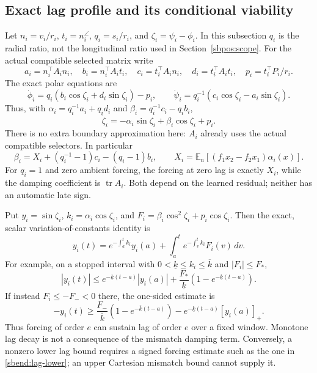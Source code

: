 \documentclass{article} %
\theoremstyle{plain}
\theoremstyle{definition}
\theoremstyle{remark}
\begin{document}
\subsection{Exact lag profile and its conditional viability}

Let $n_i=v_i/r_i$, $t_i=n_i^\angle$, $q_i=s_i/r_i$, and
$\zeta_i=\psi_i-\phi_i$. In this subsection $q_i$ is the radial ratio,
not the longitudinal ratio used in Section~\ref{sbpos:scope}.
For the actual compatible selected matrix write
\[
 a_i=n_i^\top A_i n_i,\quad b_i=n_i^\top A_i t_i,\quad
 c_i=t_i^\top A_i n_i,\quad d_i=t_i^\top A_i t_i,\quad
 p_i=t_i^\top P_i/r_i.
\]
The exact polar equations are
\[
 \dot\phi_i=q_i(b_i\cos\zeta_i+d_i\sin\zeta_i)-p_i,\qquad
 \dot\psi_i=q_i^{-1}(c_i\cos\zeta_i-a_i\sin\zeta_i).
\]
Thus, with
$\alpha_i=q_i^{-1}a_i+q_id_i$ and
$\beta_i=q_i^{-1}c_i-q_ib_i$,
\begin{equation}\label{sbend:lag-exact}
 \dot\zeta_i=-\alpha_i\sin\zeta_i+\beta_i\cos\zeta_i+p_i.
\end{equation}
There is no extra boundary approximation here: $A_i$ already uses the
actual compatible selectors. In particular
\begin{equation}\label{sbend:lag-skew}
 \beta_i=X_i+(q_i^{-1}-1)c_i-(q_i-1)b_i,\qquad
 X_i=\mathbb E_n[(f_1x_2-f_2x_1)\alpha_i(x)].
\end{equation}
For $q_i=1$ and zero ambient forcing, the forcing at zero lag is
exactly $X_i$, while the damping coefficient is $\operatorname{tr}A_i$.
Both depend on the learned residual; neither has an automatic late sign.

Put $y_i=\sin\zeta_i$, $k_i=\alpha_i\cos\zeta_i$, and
$F_i=\beta_i\cos^2\zeta_i+p_i\cos\zeta_i$. Then the exact, scalar
variation-of-constants identity is
\begin{equation}\label{sbend:lag-profile}
 y_i(t)=e^{-\int_a^t k_i}y_i(a)
             +\int_a^t e^{-\int_v^t k_i}F_i(v)\,dv.
\end{equation}
For example, on a stopped interval with
$0<\underline k\le k_i\le\overline k$ and $|F_i|\le F_*$,
\[
 |y_i(t)|\le e^{-\underline k(t-a)}|y_i(a)|
       +\frac{F_*}{\underline k}(1-e^{-\underline k(t-a)}).
\]
If instead $F_i\le-F_-<0$ there, the one-sided estimate is
\begin{equation}\label{sbend:lag-lower}
 -y_i(t)\ge
 \frac{F_-}{\overline k}(1-e^{-\overline k(t-a)})
                 -e^{-\underline k(t-a)}[y_i(a)]_+.
\end{equation}
Thus forcing of order $e$ can sustain lag of order $e$ over a fixed
window. Monotone lag decay is not a consequence of the mismatch damping
term. Conversely, a nonzero lower lag bound requires a signed forcing
estimate such as the one in \eqref{sbend:lag-lower}; an upper Cartesian
mismatch bound cannot supply it.
\end{document}

